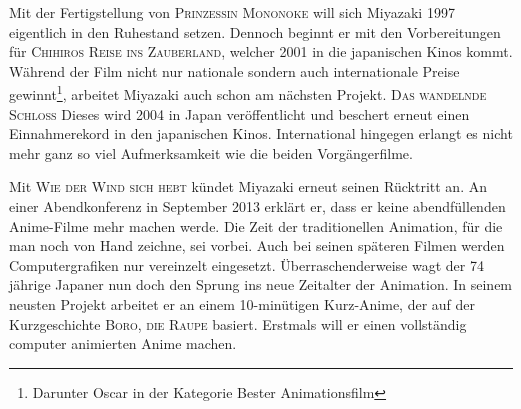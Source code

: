 Mit der Fertigstellung von \textsc{Prinzessin Mononoke} will sich Miyazaki 1997 eigentlich in den Ruhestand setzen. Dennoch beginnt er mit den Vorbereitungen für \textsc{Chihiros Reise ins Zauberland}, welcher 2001 in die japanischen Kinos kommt. Während der Film nicht nur nationale sondern auch internationale Preise gewinnt\footnote{Darunter Oscar in der Kategorie Bester Animationsfilm}, arbeitet Miyazaki auch schon am nächsten Projekt. \textsc{Das wandelnde Schloss} Dieses wird 2004 in Japan veröffentlicht und beschert erneut einen Einnahmerekord in den japanischen Kinos. International hingegen erlangt es nicht mehr ganz so viel Aufmerksamkeit wie die beiden Vorgängerfilme. 

Mit \textsc{Wie der Wind sich hebt} kündet Miyazaki erneut seinen Rücktritt an. An einer Abendkonferenz in September 2013 erklärt er, dass er keine abendfüllenden Anime-Filme mehr machen werde. Die Zeit der traditionellen Animation, für die man noch von Hand zeichne, sei vorbei. Auch bei seinen späteren Filmen werden Computergrafiken nur vereinzelt eingesetzt. Überraschenderweise wagt der 74 jährige Japaner nun doch den Sprung ins neue Zeitalter der Animation. In seinem neusten Projekt arbeitet er an einem 10-minütigen Kurz-Anime, der auf der Kurzgeschichte \textsc{Boro, die Raupe} basiert. Erstmals will er einen vollständig computer animierten Anime machen.